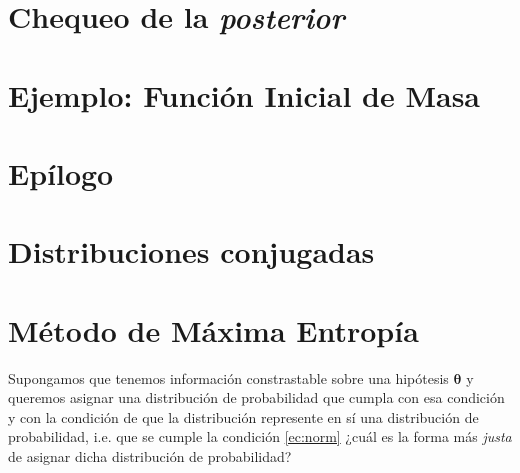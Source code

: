 \documentclass[a4paper,twoside]{article}
\newcommand{\hip}{\ensuremath{\mathbold{\theta}}\xspace}
\begin{document}

\section{Chequeo de la \emph{posterior}}


\section{Ejemplo: Función Inicial de Masa}


\section{Epílogo}

\appendix

\section{Distribuciones conjugadas}\label{sc:conjugate-pdf}


\section{Método de Máxima Entropía}\label{sc:me-method}

Supongamos que tenemos información constrastable sobre una hipótesis \(\hip\) y queremos asignar una
distribución de probabilidad que cumpla con esa condición y con la condición de que la distribución
represente en sí una distribución de probabilidad, i.e. que se cumple la condición \eqref{ec:norm}
¿cuál es la forma más \emph{justa} de asignar dicha distribución de probabilidad?
\end{document}
